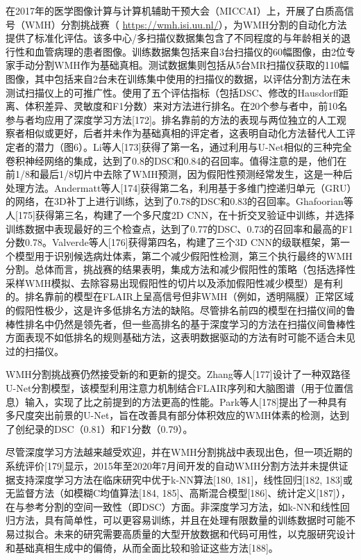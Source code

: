 \documentclass[11pt]{article}
\begin{document}
在2017年的医学图像计算与计算机辅助干预大会（MICCAI）上，开展了白质高信号（WMH）分割挑战赛（ \url{https://wmh.isi.uu.nl/}），为WMH分割的自动化方法提供了标准化评估。该多中心/多扫描仪数据集包含了不同程度的与年龄相关的退行性和血管病理的患者图像。训练数据集包括来自3台扫描仪的60幅图像，由2位专家手动分割WMH作为基础真相。测试数据集则包括从5台MR扫描仪获取的110幅图像，其中包括来自2台未在训练集中使用的扫描仪的数据，以评估分割方法在未测试扫描仪上的可推广性。使用了五个评估指标（包括DSC、修改的Hausdorff距离、体积差异、灵敏度和F1分数）来对方法进行排名。在20个参与者中，前10名参与者均应用了深度学习方法[172]。排名靠前的方法的表现与两位独立的人工观察者相似或更好，后者并未作为基础真相的评定者，这表明自动化方法替代人工评定者的潜力（图6）。Li等人[173]获得了第一名，通过利用与U-Net相似的三种完全卷积神经网络的集成，达到了0.8的DSC和0.84的召回率。值得注意的是，他们在前1/8和最后1/8切片中去除了WMH预测，因为假阳性预测经常发生，这是一种后处理方法。Andermatt等人[174]获得第二名，利用基于多维门控递归单元（GRU）的网络，在3D补丁上进行训练，达到了0.78的DSC和0.83的召回率。Ghafoorian等人[175]获得第三名，构建了一个多尺度2D CNN，在十折交叉验证中训练，并选择训练数据中表现最好的三个检查点，达到了0.77的DSC、0.73的召回率和最高的F1分数0.78。Valverde等人[176]获得第四名，构建了三个3D CNN的级联框架，第一个模型用于识别候选病灶体素，第二个减少假阳性检测，第三个执行最终的WMH分割。总体而言，挑战赛的结果表明，集成方法和减少假阳性的策略（包括选择性采样WMH模拟、去除容易出现假阳性的切片以及添加假阳性减少模型）是有利的。排名靠前的模型在FLAIR上呈高信号但非WMH（例如，透明隔膜）正常区域的假阳性极少，这是许多低排名方法的缺陷。尽管排名前四的模型在扫描仪间的鲁棒性排名中仍然是领先者，但一些高排名的基于深度学习的方法在扫描仪间鲁棒性方面表现不如低排名的规则基础方法，这表明数据驱动的方法有时可能不适合未见过的扫描仪。


WMH分割挑战赛仍然接受新的和更新的提交。Zhang等人[177]设计了一种双路径U-Net分割模型，该模型利用注意力机制结合FLAIR序列和大脑图谱（用于位置信息）输入，实现了比之前提到的方法更高的性能。Park等人[178]提出了一种具有多尺度突出前景的U-Net，旨在改善具有部分体积效应的WMH体素的检测，达到了创纪录的DSC（0.81）和F1分数（0.79）。

尽管深度学习方法越来越受欢迎，并在WMH分割挑战中表现出色，但一项近期的系统评价[179]显示，2015年至2020年7月间开发的自动WMH分割方法并未提供证据支持深度学习方法在临床研究中优于k-NN算法[180, 181]，线性回归[182, 183]或无监督方法（如模糊C均值算法[184, 185]、高斯混合模型[186]、统计定义[187]），在与参考分割的空间一致性（即DSC）方面。非深度学习方法，如k-NN和线性回归方法，具有简单性，可以更容易训练，并且在处理有限数量的训练数据时可能不易过拟合。未来的研究需要高质量的大型开放数据和代码可用性，以克服研究设计和基础真相生成中的偏倚，从而全面比较和验证这些方法[188]。
\end{document}
